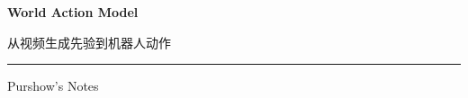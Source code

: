 \documentclass[11pt,a4paper,fontset=none]{ctexart}
\begin{document}
\begin{titlepage}
  \centering
  \vspace*{0.20\textheight}
  {\Huge\bfseries\sffamily\color{wamblue} World Action Model\par}
  \vspace{1.2em}
  {\LARGE\sffamily 从视频生成先验到机器人动作\par}
  \vspace{2.2em}
  {\color{wamgray}\rule{0.54\textwidth}{0.6pt}\par}
  \vfill
  {\large\sffamily Purshow's Notes\par}
  \vspace*{0.10\textheight}
\end{titlepage}

\tableofcontents
\clearpage

\end{document}
